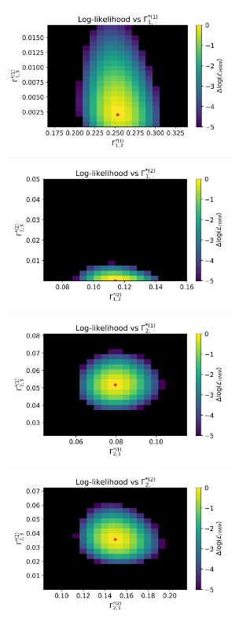 \documentclass{article}
\begin{document}
        \begin{center}
        \includegraphics[width=3in]{../Plots/2019/20190902-182840-CATs_OB_1_0_267_CarHHMM2_fine-gamma-likelihood-0-row_0.png}
        \includegraphics[width=3in]{../Plots/2019/20190902-182840-CATs_OB_1_0_267_CarHHMM2_fine-gamma-likelihood-1-row_0.png}
        \includegraphics[width=3in]{../Plots/2019/20190902-182840-CATs_OB_1_0_267_CarHHMM2_fine-gamma-likelihood-0-row_1.png}
        \includegraphics[width=3in]{../Plots/2019/20190902-182840-CATs_OB_1_0_267_CarHHMM2_fine-gamma-likelihood-1-row_1.png}

\end{center}
\end{document}
